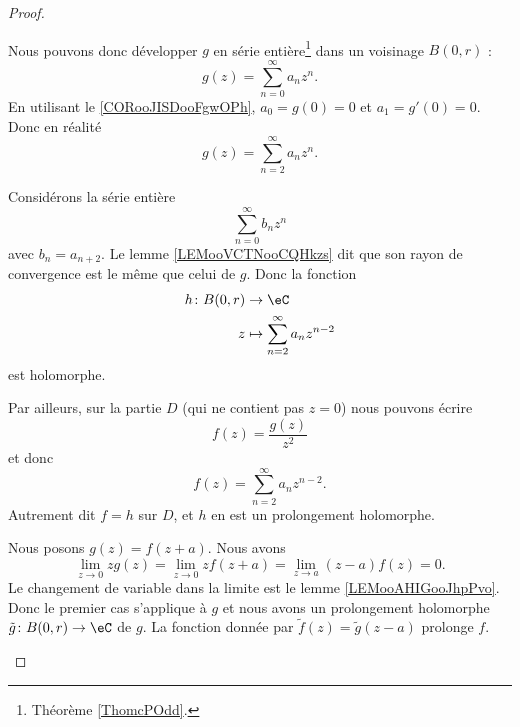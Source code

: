 \begin{proof}
\begin{subproof}
		Nous pouvons donc développer \( g\) en série entière\footnote{Théorème \ref{ThomcPOdd}.} dans un voisinage \( B(0,r)\) :
		\begin{equation}
			g(z)=\sum_{n=0}^{\infty}a_nz^n.
		\end{equation}
		En utilisant le \ref{CORooJISDooFgwOPh}, \( a_0=g(0)=0\) et \( a_1=g'(0)=0\). Donc en réalité
		\begin{equation}
			g(z)=\sum_{n=2}^{\infty}a_nz^n.
		\end{equation}

		Considérons la série entière
		\begin{equation}
			\sum_{n=0}^{\infty}b_nz^n
		\end{equation}
		avec \( b_n=a_{n+2}\). Le lemme \ref{LEMooVCTNooCQHkzs} dit que son rayon de convergence est le même que celui de \( g\). Donc la fonction
		\begin{equation}
			\begin{aligned}
				h\colon B(0,r) & \to \eC                               \\
				z              & \mapsto \sum_{n=2}^{\infty}a_nz^{n-2}
			\end{aligned}
		\end{equation}
		est holomorphe.

		Par ailleurs, sur la partie \( D\) (qui ne contient pas \( z=0\)) nous pouvons écrire
		\begin{equation}
			f(z)=\frac{ g(z) }{ z^2 }
		\end{equation}
		et donc
		\begin{equation}
			f(z)=\sum_{n=2}^{\infty}a_nz^{n-2}.
		\end{equation}
		Autrement dit \( f=h\) sur \( D\), et \( h\) en est un prolongement holomorphe.


		Nous posons \( g(z)=f(z+a)\). Nous avons
		\begin{equation}
			\lim_{z\to 0}zg(z)=\lim_{z\to 0}zf(z+a)=\lim_{z\to a}(z-a)f(z)=0.
		\end{equation}
		Le changement de variable dans la limite est le lemme \ref{LEMooAHIGooJhpPvo}. Donc le premier cas s'applique à \( g\) et nous avons un prolongement holomorphe \( \tilde g\colon B(0,r)\to \eC\) de \( g\). La fonction donnée par \( \tilde f(z)=\tilde g(z-a)\) prolonge \( f\).
	\end{subproof}
\end{proof}

